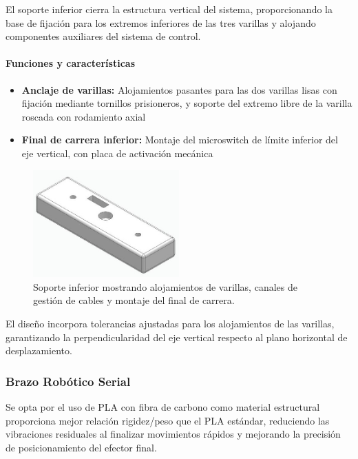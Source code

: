 El soporte inferior cierra la estructura vertical del sistema, proporcionando la base de fijación para los extremos inferiores de las tres varillas y alojando componentes auxiliares del sistema de control.

\paragraph{Funciones y características}

\begin{itemize}
    \item \textbf{Anclaje de varillas:} Alojamientos pasantes para las dos varillas lisas con fijación mediante tornillos prisioneros, y soporte del extremo libre de la varilla roscada con rodamiento axial
    \item \textbf{Final de carrera inferior:} Montaje del microswitch de límite inferior del eje vertical, con placa de activación mecánica
\end{itemize}

\begin{figure}[H]
    \centering
    \includegraphics[width=0.5\textwidth]{img/InferiorReal_simplificado_vista.jpg}
    \caption{Soporte inferior mostrando alojamientos de varillas, canales de gestión de cables y montaje del final de carrera.}
    \label{fig:soporte_inferior_real}
\end{figure}

El diseño incorpora tolerancias ajustadas para los alojamientos de las varillas, garantizando la perpendicularidad del eje vertical respecto al plano horizontal de desplazamiento.

\subsubsection{Brazo Robótico Serial}

Se opta por el uso de PLA con fibra de carbono como material estructural proporciona mejor relación rigidez/peso que el PLA estándar, reduciendo las vibraciones residuales al finalizar movimientos rápidos y mejorando la precisión de posicionamiento del efector final.

